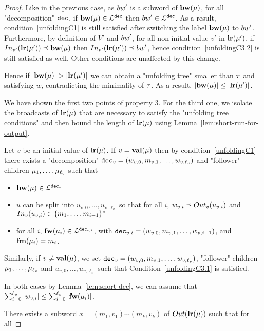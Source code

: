 \begin{proof}
	Like in the previous case, as $\bossspec'$ is a subword of $\mathbf{bw}(\mu)$, for all "decomposition" $\mathtt{dec}$, if $\mathbf{bw}(\mu) \in \mathcal{L}^{\mathtt{\mathtt{dec}}}$ then $\bossspec' \in \langdec{\decsymb}$. As a result, condition~\ref{unfoldingC1} is still satisfied after switching the label $\mathbf{bw}(\mu)$ to $\bossspec'$. Furthermore, by definition of $V'$ and $\bossspec'$, for all non-initial value $v'$ in $\mathbf{lr}(\mu')$, if $\vinput{v'}{\localrunlabel{\node'}} \subword \bosslabel{\node}$ then  $\vinput{v'}{\localrunlabel{\node'}} \subword \bossspec'$, hence condition~\ref{unfoldingC3.2} is still satisfied as well. Other conditions are unaffected by this change.
	
	Hence if $|\mathbf{bw}(\mu)| > |\mathbf{lr}(\mu')|$ we can obtain a "unfolding tree" smaller than $\tau$ and satisfying $w$, contradicting the minimality of $\tau$. As a result, $|\mathbf{bw}(\mu)| \leq |\mathbf{lr}(\mu')|$.
	
	We have shown the first two points of property 3. For the third one, we isolate the broadcasts of $\mathbf{lr}(\mu)$ that are necessary to satisfy the "unfolding tree conditions" and then bound the length of $\mathbf{lr}(\mu)$ using Lemma~\ref{lem:short-run-for-output}.
	
	Let $v$ be an initial value of $\mathbf{lr}(\mu)$. If $v = \mathbf{val}(\mu)$ then by condition~\ref{unfoldingC1} there exists a "decomposition" $\mathtt{dec}_v = (w_{v,0}, m_{v,1}, \ldots, w_{v,\ell_v})$ and "follower" children $\mu_1, \ldots, \mu_{\ell_v}$ such that
	\begin{itemize}
		\item $\mathbf{bw}(\mu) \in \mathcal{L}^{\mathtt{\mathtt{dec}_v}}$
		\item $u$ can be split into $u_{v,0}, \ldots, u_{v,\ell_v}$ so that for all $i$, $w_{v,i} \subword \voutput{v}{u_{v,i}}$ and $\vinput{v}{u_{v,i}} \in \set{m_1, \ldots, m_{i-1}}^*$
		
		\item for all $i$, $\mathbf{fw}(\mu_i) \in \mathcal{L}^{\mathtt{\mathtt{dec}_{v,i}}}$, with $\mathtt{dec}_{v,i}= (w_{v,0}, m_{v,1}, \ldots, w_{v,i-1})$, and $\mathbf{fm}(\mu_i) = m_i$.
	\end{itemize}
	
	Similarly, if $v \neq \mathbf{val}(\mu)$, we set $\mathtt{dec}_v = (w_{v,0}, m_{v,1}, \ldots, w_{v,\ell_v})$, "follower" children $\mu_1, \ldots, \mu_{\ell_v}$ and $u_{v,0}, \ldots, u_{v,\ell_v}$ such that Condition~\ref{unfoldingC3.1} is satisfied.
	
	In both cases by Lemma~\ref{lem:short-dec}, we can assume that $\sum_{i=0}^{\ell_v} |w_{v,i}| \leq \sum_{i=0}^{\ell_v} |\mathbf{fw}(\mu_i)|$. 
	
	There exists a subword $x = (m_1, v_1) \cdots (m_k, v_k)$ of $\Output{\localrunlabel{\node}}$ such that for all
	
\end{proof}

